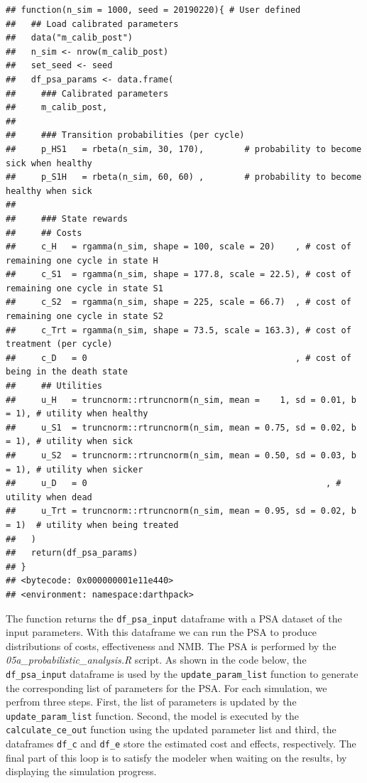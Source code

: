 \documentclass[]{book}
\begin{document}
\begin{verbatim}
## function(n_sim = 1000, seed = 20190220){ # User defined
##   ## Load calibrated parameters
##   data("m_calib_post")
##   n_sim <- nrow(m_calib_post)
##   set_seed <- seed
##   df_psa_params <- data.frame(
##     ### Calibrated parameters
##     m_calib_post,
##     
##     ### Transition probabilities (per cycle)
##     p_HS1   = rbeta(n_sim, 30, 170),        # probability to become sick when healthy
##     p_S1H   = rbeta(n_sim, 60, 60) ,        # probability to become healthy when sick
##     
##     ### State rewards
##     ## Costs
##     c_H   = rgamma(n_sim, shape = 100, scale = 20)    , # cost of remaining one cycle in state H
##     c_S1  = rgamma(n_sim, shape = 177.8, scale = 22.5), # cost of remaining one cycle in state S1
##     c_S2  = rgamma(n_sim, shape = 225, scale = 66.7)  , # cost of remaining one cycle in state S2
##     c_Trt = rgamma(n_sim, shape = 73.5, scale = 163.3), # cost of treatment (per cycle)
##     c_D   = 0                                         , # cost of being in the death state
##     ## Utilities
##     u_H   = truncnorm::rtruncnorm(n_sim, mean =    1, sd = 0.01, b = 1), # utility when healthy
##     u_S1  = truncnorm::rtruncnorm(n_sim, mean = 0.75, sd = 0.02, b = 1), # utility when sick
##     u_S2  = truncnorm::rtruncnorm(n_sim, mean = 0.50, sd = 0.03, b = 1), # utility when sicker
##     u_D   = 0                                               , # utility when dead
##     u_Trt = truncnorm::rtruncnorm(n_sim, mean = 0.95, sd = 0.02, b = 1)  # utility when being treated
##   )
##   return(df_psa_params)
## }
## <bytecode: 0x000000001e11e440>
## <environment: namespace:darthpack>
\end{verbatim}

The function returns the \texttt{df\_psa\_input} dataframe with a PSA dataset of the input parameters. With this dataframe we can run the PSA to produce distributions of costs, effectiveness and NMB. The PSA is performed by the \emph{05a\_probabilistic\_analysis.R} script. As shown in the code below, the \texttt{df\_psa\_input} dataframe is used by the \texttt{update\_param\_list} function to generate the corresponding list of parameters for the PSA. For each simulation, we perfrom three steps. First, the list of parameters is updated by the \texttt{update\_param\_list} function. Second, the model is executed by the \texttt{calculate\_ce\_out} function using the updated parameter list and third, the dataframes \texttt{df\_c} and \texttt{df\_e} store the estimated cost and effects, respectively. The final part of this loop is to satisfy the modeler when waiting on the results, by displaying the simulation progress.
\end{document}
